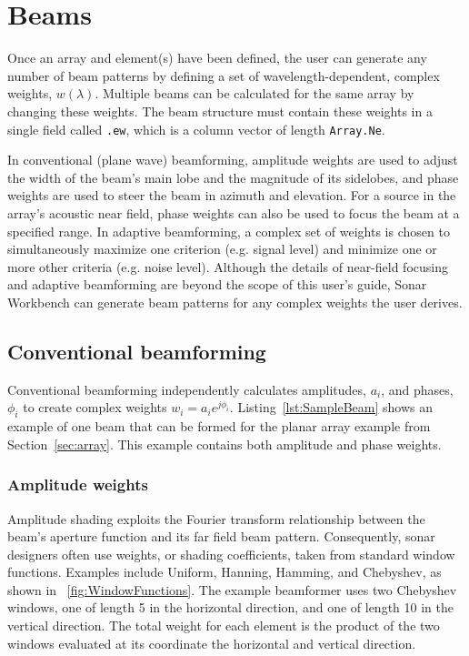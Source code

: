 \section{Beams}\label{sec:beam}

Once an array and element(s) have been defined, the user can generate any number of beam patterns by defining a set of wavelength-dependent, complex weights, $w(\lambda)$. Multiple beams can be calculated for the same array by changing these weights. The beam structure must contain these weights in a single field called \texttt{.ew}, which is a column vector of length \texttt{Array.Ne}.

In conventional (plane wave) beamforming, amplitude weights are used to adjust the width of the beam's main lobe and the magnitude of its sidelobes, and phase weights are used to steer the beam in azimuth and elevation. For a source in the array's acoustic near field, phase weights can also be used to focus the beam at a specified range. In adaptive beamforming, a complex set of weights is chosen to simultaneously maximize one criterion (e.g. signal level) and minimize one or more other criteria (e.g. noise level). Although the details of near-field focusing and adaptive beamforming are beyond the scope of this user's guide, Sonar Workbench can generate beam patterns for any complex weights the user derives.

\subsection{Conventional beamforming}

Conventional beamforming independently calculates amplitudes, $a_i$, and phases, $\phi_i$ to create complex weights $w_i=a_ie^{j\phi_i}$. Listing~\ref{lst:SampleBeam} shows an example of one beam that can be formed for the planar array example from Section~\ref{sec:array}. This example contains both amplitude and phase weights.



\subsubsection{Amplitude weights}

Amplitude shading exploits the Fourier transform relationship between the beam's aperture function and its far field beam pattern. Consequently, sonar designers often use weights, or shading coefficients, taken from standard window functions. Examples include Uniform, Hanning, Hamming, and Chebyshev, as shown in \figname~\ref{fig:WindowFunctions}. The example beamformer uses two Chebyshev windows, one of length 5 in the horizontal direction, and one of length 10 in the vertical direction. The total weight for each element is the product of the two windows evaluated at its coordinate the horizontal and vertical direction.

